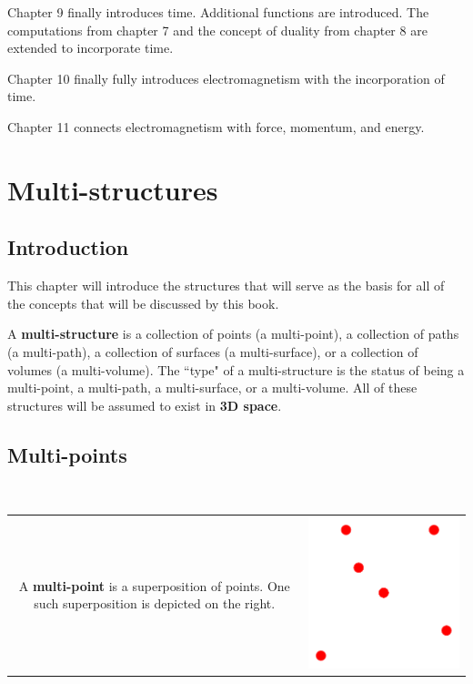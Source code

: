 \documentclass{book}
\begin{document}
Chapter 9 finally introduces time. Additional functions are introduced. The computations from chapter 7 and the concept of duality from chapter 8 are extended to incorporate time.

Chapter 10 finally fully introduces electromagnetism with the incorporation of time.  

Chapter 11 connects electromagnetism with force, momentum, and energy. 


\tableofcontents




\mainmatter


\chapter{Multi-structures}

\section{Introduction}

This chapter will introduce the structures that will serve as the basis for all of the concepts that will be discussed by this book. 

A \textbf{multi-structure} is a collection of points (a multi-point), a collection of paths (a multi-path), a collection of surfaces (a multi-surface), or a collection of volumes (a multi-volume). The ``type" of a multi-structure is the status of being a multi-point, a multi-path, a multi-surface, or a multi-volume. All of these structures will be assumed to exist in {\bf 3D space}.


\section{Multi-points}

~

\begin{tabular}{cc}
\parbox{0.5\textwidth}{
A \textbf{multi-point} is a superposition of points. One such superposition is depicted on the right.
} & \parbox{0.5\textwidth}{
\includegraphics[scale = 0.75]{Multi-structures/Multipoints/multi-point_simple}
}
\end{tabular}
\end{document}
